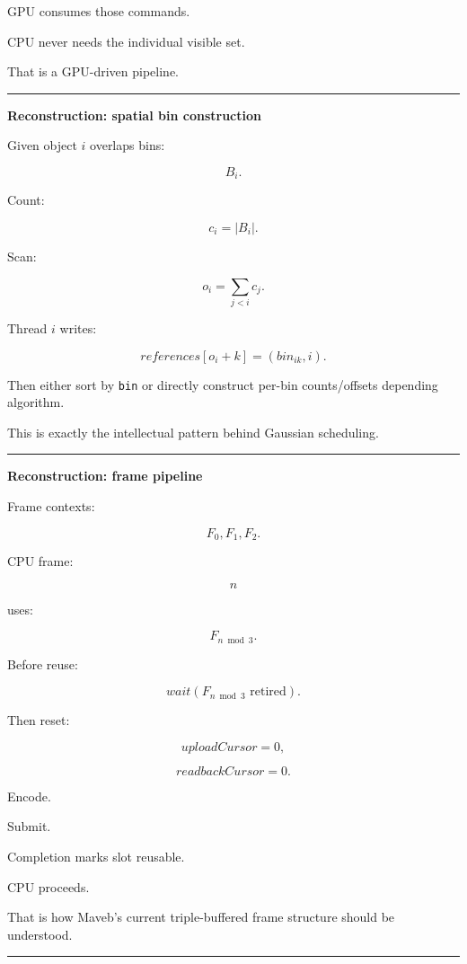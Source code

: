 GPU consumes those commands.

CPU never needs the individual visible set.

That is a GPU-driven pipeline.

\begin{center}\rule{0.5\linewidth}{0.5pt}\end{center}

\textbf{Reconstruction: spatial bin construction}

Given object \(i\) overlaps bins:

\[
B_i.
\]

Count:

\[
c_i=|B_i|.
\]

Scan:

\[
o_i=
\sum_{j<i}c_j.
\]

Thread \(i\) writes:

\[
references[
o_i+k
]
=
(
bin_{ik},
i
).
\]

Then either sort by \texttt{bin} or directly construct per-bin counts/offsets depending algorithm.

This is exactly the intellectual pattern behind Gaussian scheduling.

\begin{center}\rule{0.5\linewidth}{0.5pt}\end{center}

\textbf{Reconstruction: frame pipeline}

Frame contexts:

\[
F_0,F_1,F_2.
\]

CPU frame:

\[
n
\]

uses:

\[
F_{n\bmod3}.
\]

Before reuse:

\[
wait(
F_{n\bmod3}
\text{ retired}
).
\]

Then reset:

\[
uploadCursor=0,
\]

\[
readbackCursor=0.
\]

Encode.

Submit.

Completion marks slot reusable.

CPU proceeds.

That is how Maveb's current triple-buffered frame structure should be understood.

\begin{center}\rule{0.5\linewidth}{0.5pt}\end{center}

